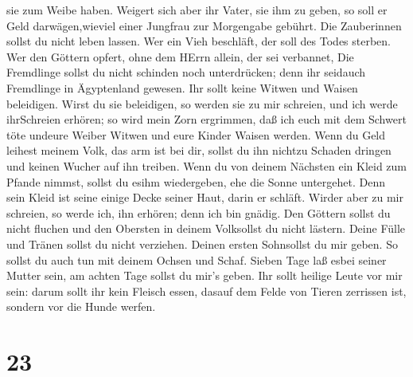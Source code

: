 sie zum Weibe haben.  Weigert sich aber ihr Vater, sie ihm
zu geben, so soll er Geld darwägen,wieviel einer Jungfrau zur Morgengabe
gebührt.  Die Zauberinnen sollst du nicht leben lassen.
 Wer ein Vieh beschläft, der soll des Todes sterben.
 Wer den Göttern opfert, ohne dem HErrn allein, der sei
verbannet,  Die Fremdlinge sollst du nicht schinden noch
unterdrücken; denn ihr seidauch Fremdlinge in Ägyptenland gewesen.
 Ihr sollt keine Witwen und Waisen beleidigen.
 Wirst du sie beleidigen, so werden sie zu mir schreien,
und ich werde ihrSchreien erhören;  so wird mein Zorn
ergrimmen, daß ich euch mit dem Schwert töte undeure Weiber Witwen und
eure Kinder Waisen werden.  Wenn du Geld leihest meinem
Volk, das arm ist bei dir, sollst du ihn nichtzu Schaden dringen und
keinen Wucher auf ihn treiben.  Wenn du von deinem Nächsten
ein Kleid zum Pfande nimmst, sollst du esihm wiedergeben, ehe die Sonne
untergehet.  Denn sein Kleid ist seine einige Decke seiner
Haut, darin er schläft. Wirder aber zu mir schreien, so werde ich, ihn
erhören; denn ich bin gnädig.  Den Göttern sollst du nicht
fluchen und den Obersten in deinem Volksollst du nicht lästern.
 Deine Fülle und Tränen sollst du nicht verziehen. Deinen
ersten Sohnsollst du mir geben.  So sollst du auch tun mit
deinem Ochsen und Schaf. Sieben Tage laß esbei seiner Mutter sein, am
achten Tage sollst du mir's geben.  Ihr sollt heilige Leute
vor mir sein: darum sollt ihr kein Fleisch essen, dasauf dem Felde von
Tieren zerrissen ist, sondern vor die Hunde werfen.

\hypertarget{section-22}{%
\section{23}\label{section-22}}

